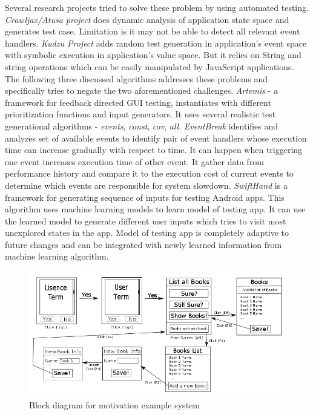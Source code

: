 \documentclass[authoryear,preprint, twocolumn]{sigplanconf}
\begin{document}
\newline Several research projects tried to solve these problem by using automated testing. \emph{Crawljax/Atusa project} does dynamic analysis of application state space and generates test case. Limitation is it may not be able to detect all relevant event handlers. \emph{Kudzu Project} adds random test generation in application's event space with symbolic execution in application's value space. But it relies on String and string operations which can be easily manipulated by JavaScript applications.
\newline The following three discussed algorithms addresses these problems and specifically tries to negate the two aforementioned challenges.
\newline \emph{Artemis} - a framework for feedback directed GUI testing, instantiates with different prioritization functions and input generators. It uses several realistic test generational algorithms - \emph{events}, \emph{const}, \emph{cov}, \emph{all}. %
\newline \emph{EventBreak} identifies and analyzes set of available events to identify pair of event handlers whose execution time can increase gradually with respect to time. It can happen when triggering one event increases execution time of other event. It gather data from performance history and compare it to the execution cost of current events to determine which events are responsible for system slowdown.
\newline \emph{SwiftHand} is a framework for generating sequence of inputs for testing Android apps. This algorithm uses machine learning models to learn model of testing app. It can use the learned model to generate different user inputs which tries to visit most unexplored states in the app. Model of testing app is completely adaptive to future changes and can be integrated with newly learned information from machine learning algorithm.
\begin{figure}[!t]
	\includegraphics[width=\textwidth]{figures/ptaArchitecture0002}
	\caption[Block diagram for motivation example system]{\label{f:sysarchtect}Block diagram for motivation example system}
\end{figure}
\end{document}
